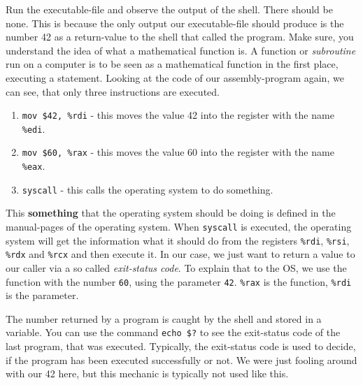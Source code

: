 \documentclass{dcbl/challenge}
\begin{document}
\begin{aufgabe}
    Run the executable-file and observe the output of the shell.
    There should be none. 
    This is because the only output our executable-file should produce is the number 42 as a return-value to the shell that called the program.
    Make sure, you understand the idea of what a mathematical function is.
    A function or \textit{subroutine} run on a computer is to be seen as a mathematical function in the first place, executing a statement. 
    Looking at the code of our assembly-program again, we can see, that only three instructions are executed. 
    \begin{enumerate}
        \item \texttt{mov \$42, \%rdi} - this moves the value 42 into the register with the name \texttt{\%edi}.
        \item \texttt{mov \$60, \%rax} - this moves the value 60 into the register with the name \texttt{\%eax}.
        \item \texttt{syscall} - this calls the operating system to do something.
    \end{enumerate}
    This \textbf{something} that the operating system should be doing is defined in the manual-pages of the operating system. 
    When \texttt{syscall} is executed, the operating system will get the information what it should do from the registers \texttt{\%rdi}, \texttt{\%rsi}, \texttt{\%rdx} and \texttt{\%rcx} and then execute it.
    In our case, we just want to return a value to our caller via a so called \textit{exit-status code}.
    To explain that to the OS, we use the function with the number \texttt{60}, using the parameter \texttt{42}.
    \texttt{\%rax} is the function, \texttt{\%rdi} is the parameter.
\end{aufgabe}

\begin{aufgabe}
    The number returned by a program is caught by the shell and stored in a variable. 
    You can use the command \texttt{echo \$?} to see the exit-status code of the last program, that was executed.
    Typically, the exit-status code is used to decide, if the program has been executed successfully or not.
    We were just fooling around with our 42 here, but this mechanic is typically not used like this.
\end{aufgabe}
\end{document}
